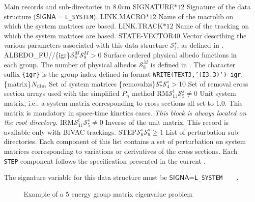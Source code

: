 \begin{DescriptionEnregistrement}{Main records and sub-directories in }{8.0cm}
\CharEnr
  {SIGNATURE}{$*12$}
  {Signature of the data structure ($\mathsf{SIGNA}=${\tt L\_SYSTEM}).}
\CharEnr
  {LINK.MACRO}{$*12$}
  {Name of the {\sc macrolib} on which the system matrices are based.}
\CharEnr
  {LINK.TRACK}{$*12$}
  {Name of the {\sc tracking} on which the system matrices are based.}
\IntEnr
  {STATE-VECTOR}{$40$}
  {Vector describing the various parameters associated with this data structure $\mathcal{S}^{s}_{i}$,
  as defined in .}
\OptRealEnr
  {ALBEDO\_FU//\{igr\}}{$\mathcal{S}^{M}_{8}$}{$\mathcal{S}^{M}_{8}>0$}{}
  {Surface ordered physical albedo functions in each group. The number of physical albedos $\mathcal{S}^{M}_{8}$ is defined
  in . The character suffix {\tt \{igr\}} is the group index defined in format {\tt WRITE(TEXT3,'(I3.3)') igr}.}
\RealVar
  {\{matrix\}}{$N_{\rm dim}$}{} 
  {Set of system matrices}
\OptRealVar
  {\{removalxs\}}{$\mathcal{S}^{s}_{7}$}{$\mathcal{S}^{s}_{4}> 10$}{} 
  {Set of removal cross section arrays used with the simplified $P_n$ method}
\OptRealEnr
  {RM}{$\mathcal{S}^{t}_{11}$}{$\mathcal{S}^{s}_{5}\ne 0$}{}
  {Unit system matrix, i.e., a system matrix corresponding to cross sections all set to 1.0. This matrix is mandatory in space-time
  kinetics cases. {\sl This block is always located on the root directory.}}
\OptRealEnr
  {IRM}{$\mathcal{S}^{t}_{11}$}{$\mathcal{S}^{s}_{5}\ne 0$}{}
  {Inverse of the unit matrix. This record is available only with BIVAC trackings.}
\OptDirlEnr
  {STEP}{$\mathcal{S}^{s}_{6}$}{$\mathcal{S}^{s}_{6}\ge 1$}
  {List of perturbation sub-directories. Each component of this list contains a set of perturbation
  on system matrices corresponding to variations or derivatives of the cross sections. Each
  {\tt STEP} component follows the specification presented in the current .}
\end{DescriptionEnregistrement}

The signature variable for this data structure must be $\mathsf{SIGNA}$=\verb*|L_SYSTEM    |.

\begin{figure}[htbp] 
\begin{center} 
\epsfxsize=13cm
\centerline{ }
\parbox{14cm}{\caption{Example of a 5 energy group matrix eigenvalue problem}\label{fig:system}}  \end{center} 
\end{figure}

